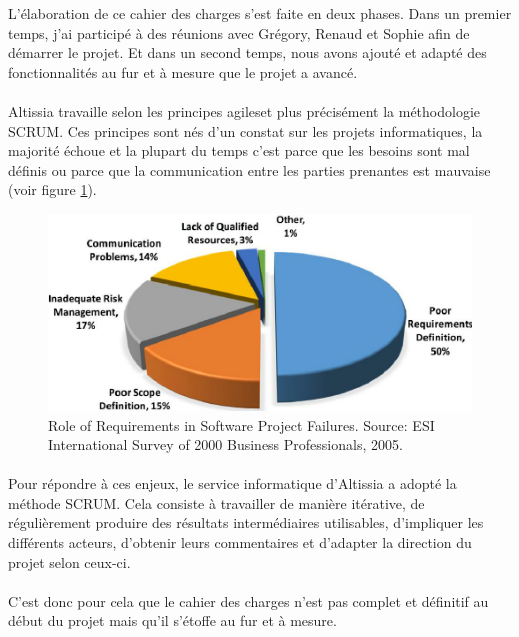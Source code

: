 L'élaboration de ce cahier des charges s'est faite en deux phases. 
Dans un premier temps, j'ai participé à des réunions avec Grégory, Renaud et Sophie afin de démarrer le projet. 
Et dans un second temps, nous avons ajouté et adapté des fonctionnalités au fur et à mesure que le projet a avancé.

\paragraph{}
Altissia travaille selon les principes agiles\fnmark et plus précisément la méthodologie SCRUM\fnmark.
Ces principes sont nés d'un constat sur les projets informatiques, la majorité échoue\cite{standish_standish_nodate} et la plupart du temps c'est parce que les besoins sont mal définis ou parce que la communication entre les parties prenantes est mauvaise (voir figure \ref{fig:why-projects-fails}).

\begin{figure}[ht]
    \centering
    \includegraphics[scale=.8]{images/why-projects-fail.png}
    \caption{Role of Requirements in Software Project Failures. Source: ESI International Survey of 2000 Business Professionals, 2005.}
    \label{fig:why-projects-fails}
\end{figure}


\paragraph{}
Pour répondre à ces enjeux, le service informatique d'Altissia a adopté la méthode SCRUM.
Cela consiste à travailler de manière itérative, de régulièrement produire des résultats intermédiaires utilisables, d'impliquer les différents acteurs, d'obtenir leurs commentaires et d'adapter la direction du projet selon ceux-ci.

\paragraph{}
C'est donc pour cela que le cahier des charges n'est pas complet et définitif au début du projet mais qu'il s'étoffe au fur et à mesure.
